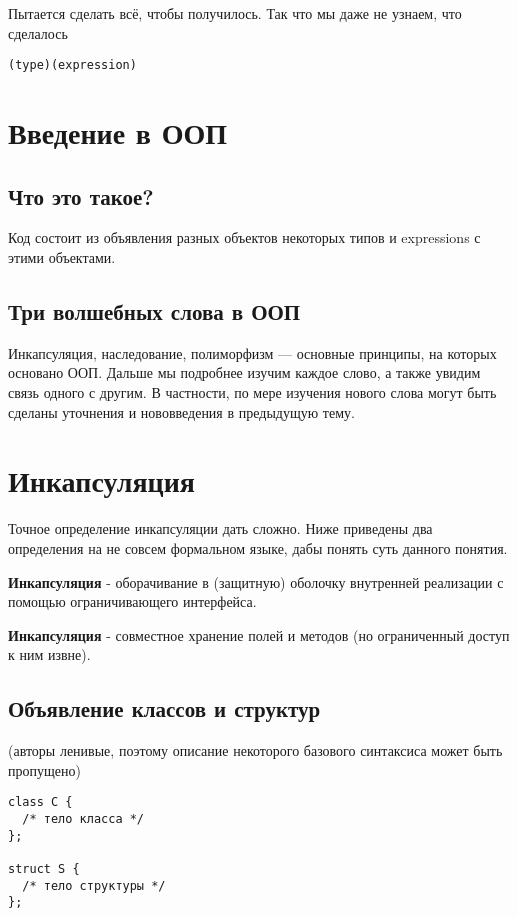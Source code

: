 \documentclass[12pt]{article}
\begin{document}
Пытается сделать всё, чтобы получилось. Так что мы даже не узнаем, что сделалось

\begin{lstlisting}
(type)(expression)	
\end{lstlisting}

\section{Введение в ООП}

\subsection{Что это такое?}

Код состоит из объявления разных объектов некоторых типов и expressions с этими объектами.   

\subsection{Три волшебных слова в ООП}

Инкапсуляция, наследование, полиморфизм --- основные принципы, на которых основано ООП. Дальше мы подробнее изучим каждое слово, а также увидим связь одного с другим. В частности, по мере изучения нового слова могут быть сделаны уточнения и нововведения в предыдущую тему. 

\section{Инкапсуляция}

Точное определение инкапсуляции дать сложно. Ниже приведены два определения на не совсем формальном языке, дабы понять суть данного понятия. 

\textbf{Инкапсуляция} - оборачивание в (защитную) оболочку внутренней реализации с помощью ограничивающего интерфейса. 

\textbf{Инкапсуляция} - совместное хранение полей и методов (но ограниченный доступ к ним извне).  

\subsection[Классы и структуры]{Объявление классов и структур} (авторы ленивые, поэтому описание некоторого базового синтаксиса может быть пропущено)

\begin{lstlisting}
class C {
  /* тело класса */
};

struct S {
  /* тело структуры */
};
\end{lstlisting}
\end{document}
